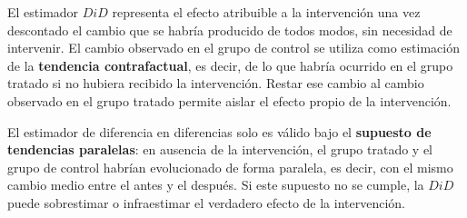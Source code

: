 \documentclass[
  spanish,
  a4paper,
]{scrreport}
\theoremstyle{definition}
\theoremstyle{definition}
\theoremstyle{remark}
\begin{document}
\begin{tcolorbox}[enhanced jigsaw, arc=.35mm, bottomrule=.15mm, bottomtitle=1mm, breakable, colback=white, colbacktitle=quarto-callout-note-color!10!white, colframe=quarto-callout-note-color-frame, coltitle=black, left=2mm, leftrule=.75mm, opacityback=0, opacitybacktitle=0.6, rightrule=.15mm, title=\textcolor{quarto-callout-note-color}{\faInfo}\hspace{0.5em}{Interpretación}, titlerule=0mm, toprule=.15mm, toptitle=1mm]

El estimador \(DiD\) representa el efecto atribuible a la intervención
una vez descontado el cambio que se habría producido de todos modos, sin
necesidad de intervenir. El cambio observado en el grupo de control se
utiliza como estimación de la \textbf{tendencia contrafactual}, es
decir, de lo que habría ocurrido en el grupo tratado si no hubiera
recibido la intervención. Restar ese cambio al cambio observado en el
grupo tratado permite aislar el efecto propio de la intervención.

\end{tcolorbox}

\begin{tcolorbox}[enhanced jigsaw, arc=.35mm, bottomrule=.15mm, bottomtitle=1mm, breakable, colback=white, colbacktitle=quarto-callout-warning-color!10!white, colframe=quarto-callout-warning-color-frame, coltitle=black, left=2mm, leftrule=.75mm, opacityback=0, opacitybacktitle=0.6, rightrule=.15mm, title=\textcolor{quarto-callout-warning-color}{\faExclamationTriangle}\hspace{0.5em}{Advertencia}, titlerule=0mm, toprule=.15mm, toptitle=1mm]

El estimador de diferencia en diferencias solo es válido bajo el
\textbf{supuesto de tendencias paralelas}: en ausencia de la
intervención, el grupo tratado y el grupo de control habrían
evolucionado de forma paralela, es decir, con el mismo cambio medio
entre el antes y el después. Si este supuesto no se cumple, la \(DiD\)
puede sobrestimar o infraestimar el verdadero efecto de la intervención.

\end{tcolorbox}
\end{document}
